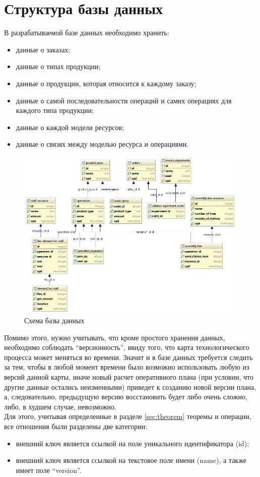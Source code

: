 \section{Структура базы данных}

\indent В разрабатываемой базе данных необходимо хранить:

\begin{itemize}
	\item данные о заказах;
	\item данные о типах продукции;
	\item данные о продукции, которая относится к каждому заказу;
	\item данные о самой последовательности операций и самих операциях для каждого типа продукции;
	\item данные о каждой модели ресурсов;
	\item данные о связях между моделью ресурса и операциями.
\end{itemize}

\begin{figure}[ht]
	\centering
	\includegraphics[width=\linewidth]{pics/databaseSchema.png}
	\caption{Схема базы данных}
	\label{fig:dbSchema}
\end{figure}


\indent Помимо этого, нужно учитывать, что кроме простого хранения данных, необходимо соблюдать ``версионность'', ввиду того, что карта технологического процесса может меняться во времени.
Значит и в базе данных требуется следить за тем, чтобы в любой момент времени было возможно использовать любую из версий данной карты, иначе новый расчет оперативного плана (при условии, что другие данные остались неизменными) приведет к созданию новой версии плана, а, следовательно, предыдущую версию восстановить будет либо очень сложно, либо, в худшем случае, невозможно.\\
\indent Для этого, учитывая определенные в разделе \ref{sec:theorem} теоремы и операции, все отношения были разделены две категории: 
\begin{itemize}
	\item внешний ключ является ссылкой на поле уникального идентификатора (id);
	\item внешний ключ является ссылкой на текстовое поле имени (name), а также имеет поле ``version''.
\end{itemize}

